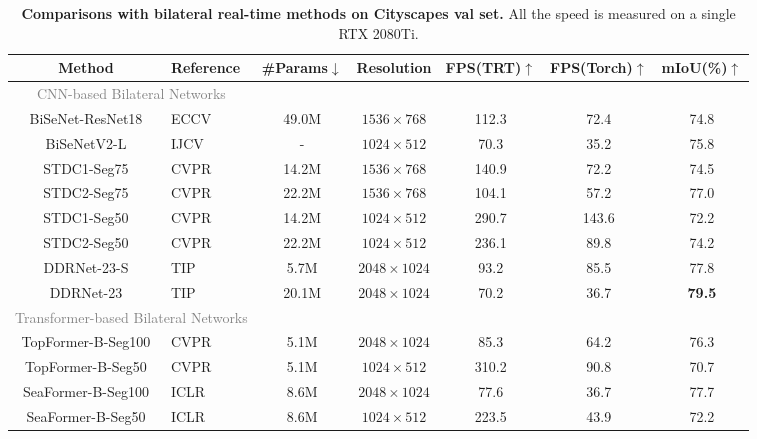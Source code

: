 \documentclass[letterpaper]{article} %
\begin{document}
\begin{table}[t]
  \caption{\textbf{Comparisons with bilateral real-time methods on Cityscapes val set.} All the speed is measured on a single RTX 2080Ti.}
  \label{tab:suppSOTA}
    \centering
  \begin{tabular}{c l|c|c|c|c|c}%
    \Xhline{1pt}
    Method & Reference &\#Params$\downarrow$ &Resolution &FPS(TRT)$\uparrow$ &FPS(Torch)$\uparrow$ &mIoU(\%)$\uparrow$  \\
    \hline
    \multicolumn{2}{c|}{\textcolor{gray}{CNN-based Bilateral Networks}} & &  & & &\\
    BiSeNet-ResNet18  &ECCV~\citeyear{yu2018bisenet}  &49.0M  &$1536 \times 768$     &112.3 &72.4 &74.8  \\
    BiSeNetV2-L      &IJCV~\citeyear{yu2021bisenet}   &-      &$1024 \times 512$    &70.3 &35.2   &75.8   \\
    STDC1-Seg75 &CVPR~\citeyear{fan2021rethinking} &14.2M &$1536 \times 768$ &140.9 &72.2 &74.5 \\
    STDC2-Seg75 &CVPR~\citeyear{fan2021rethinking} &22.2M &$1536 \times 768$ &104.1 &57.2  &77.0 \\
    STDC1-Seg50 &CVPR~\citeyear{fan2021rethinking} &14.2M &$1024 \times 512$ &290.7 &143.6 &72.2 \\
    STDC2-Seg50 &CVPR~\citeyear{fan2021rethinking} &22.2M &$1024 \times 512$ &236.1 &89.8  &74.2 \\
    DDRNet-23-S &TIP~\citeyear{pan2022deep} &5.7M &$2048 \times 1024$ &93.2 &85.5 &77.8 \\
    DDRNet-23 &TIP~\citeyear{pan2022deep} &20.1M &$2048 \times 1024$ &70.2 &36.7 &\textbf{79.5} \\
    \hline
    \multicolumn{2}{c|}{\textcolor{gray}{Transformer-based Bilateral Networks}} & &  & & &\\
    TopFormer-B-Seg100 &CVPR~\citeyear{zhang2022topformer}    &5.1M &$2048 \times 1024$ &85.3 &64.2 &76.3 \\
    TopFormer-B-Seg50  &CVPR~\citeyear{zhang2022topformer}    &5.1M &$1024 \times 512$ &310.2 &90.8 &70.7\\
    SeaFormer-B-Seg100 &ICLR~\citeyear{wan2023seaformer}    &8.6M &$2048 \times 1024$ &77.6 &36.7 &77.7 \\
    SeaFormer-B-Seg50 &ICLR~\citeyear{wan2023seaformer} &8.6M &$1024 \times 512$ &223.5 &43.9 &72.2 \\

\end{tabular}
\end{table}
\end{document}
